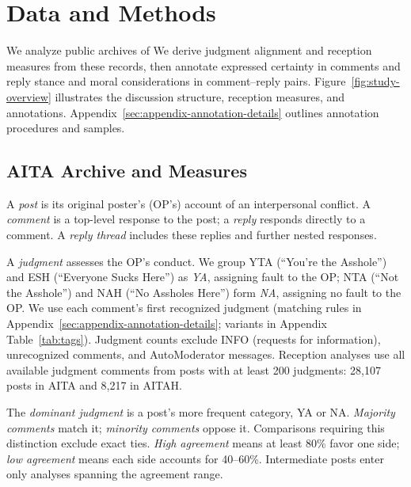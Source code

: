 \section{Data and Methods}
\label{sec:data-method}

We analyze public archives of%
We derive judgment alignment and reception measures from these records,
then annotate expressed certainty in comments and reply stance and moral
considerations in comment--reply pairs. Figure~\ref{fig:study-overview}
illustrates the discussion structure, reception measures, and annotations.
Appendix~\ref{sec:appendix-annotation-details} outlines annotation
procedures and samples.



\subsection{AITA Archive and Measures}
\label{subsec:dataset}

A \emph{post} is its original poster's (OP's) account of an interpersonal
conflict. A \emph{comment} is a top-level response to the post;
a \emph{reply} responds directly to a comment. A \emph{reply thread}
includes these replies and further nested responses.

A \emph{judgment} assesses the OP's conduct. We group YTA
(``You're the Asshole'') and ESH (``Everyone Sucks Here'') as \emph{YA},
assigning fault to the OP; NTA (``Not the Asshole'') and NAH
(``No Assholes Here'') form \emph{NA}, assigning no fault to the OP.
We use each comment's first recognized judgment
(matching rules in Appendix~\ref{sec:appendix-annotation-details};
variants in Appendix Table~\ref{tab:tags}).
Judgment counts exclude INFO (requests for information), unrecognized
comments, and AutoModerator messages. Reception analyses use all available
judgment comments from posts with at least 200 judgments: 28,107 posts
in AITA and 8,217 in AITAH.

The \emph{dominant judgment} is a post's more frequent category, YA or NA.
\emph{Majority comments} match it; \emph{minority comments} oppose it.
Comparisons requiring this distinction exclude exact ties.
\emph{High agreement} means at least 80\% favor one side;
\emph{low agreement} means each side accounts for 40--60\%.
Intermediate posts enter only analyses spanning the agreement range.

